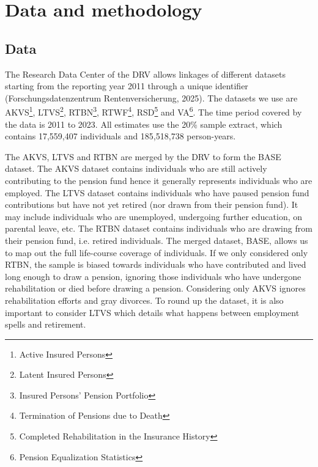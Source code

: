 \documentclass[a4paper,12pt]{article}
\theoremstyle{plain}
\theoremstyle{definition}
\theoremstyle{TheoremNum}
\theoremstyle{CorollaryNum}
\theoremstyle{PropositionNum}
\theoremstyle{TheoremNum}
\begin{document}
\section{Data and methodology}
\subsection{Data}
The Research Data Center of the DRV allows linkages of different datasets starting from the reporting year 2011 through a unique identifier (Forschungsdatenzentrum Rentenversicherung, 2025). The datasets we use are AKVS\footnote{Active Insured Persons}, LTVS\footnote{Latent Insured Persons}, RTBN\footnote{Insured Persons’ Pension Portfolio}, RTWF\footnote{Termination of Pensions due to Death}, RSD\footnote{Completed Rehabilitation in the Insurance History} and VA\footnote{Pension Equalization Statistics}. The time period covered by the data is 2011 to 2023. All estimates use the 20\% sample extract, which contains 17,559,407 individuals and 185,518,738 person-years. 

The AKVS, LTVS and RTBN are merged by the DRV to form the BASE dataset. The AKVS dataset contains individuals who are still actively contributing to the pension fund hence it generally represents individuals who are employed. The LTVS dataset contains individuals who have paused pension fund contributions but have not yet retired (nor drawn from their pension fund). It may include individuals who are unemployed, undergoing further education, on parental leave, etc. The RTBN dataset contains individuals who are drawing from their pension fund, i.e. retired individuals. The merged dataset, BASE, allows us to map out the full life-course coverage of individuals. If we only considered only RTBN, the sample is biased towards individuals who have contributed and lived long enough to draw a pension, ignoring those individuals who have undergone rehabilitation or died before drawing a pension. Considering only AKVS ignores rehabilitation efforts and gray divorces. To round up the dataset, it is also important to consider LTVS which details what happens between employment spells and retirement.
\end{document}

